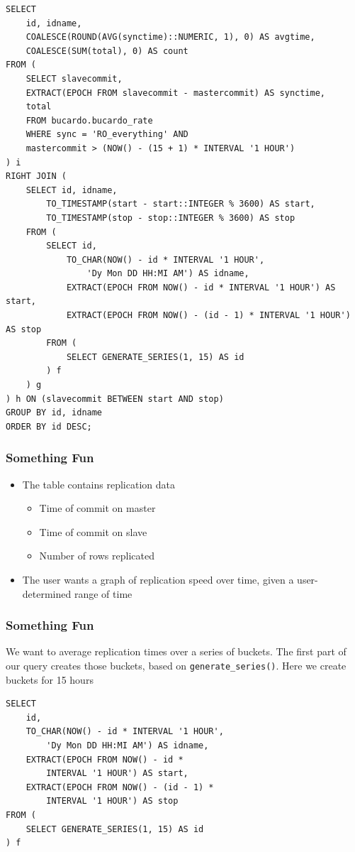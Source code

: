 \documentclass{beamer}
\begin{document}
\begin{frame}[fragile]
    \tiny
    \begin{verbatim}
SELECT
    id, idname,
    COALESCE(ROUND(AVG(synctime)::NUMERIC, 1), 0) AS avgtime,
    COALESCE(SUM(total), 0) AS count
FROM (
    SELECT slavecommit,
    EXTRACT(EPOCH FROM slavecommit - mastercommit) AS synctime,
    total
    FROM bucardo.bucardo_rate
    WHERE sync = 'RO_everything' AND
    mastercommit > (NOW() - (15 + 1) * INTERVAL '1 HOUR')
) i
RIGHT JOIN (
    SELECT id, idname,
        TO_TIMESTAMP(start - start::INTEGER % 3600) AS start,
        TO_TIMESTAMP(stop - stop::INTEGER % 3600) AS stop
    FROM (
        SELECT id,
            TO_CHAR(NOW() - id * INTERVAL '1 HOUR', 
                'Dy Mon DD HH:MI AM') AS idname,
            EXTRACT(EPOCH FROM NOW() - id * INTERVAL '1 HOUR') AS start,
            EXTRACT(EPOCH FROM NOW() - (id - 1) * INTERVAL '1 HOUR') AS stop
        FROM (
            SELECT GENERATE_SERIES(1, 15) AS id
        ) f
    ) g
) h ON (slavecommit BETWEEN start AND stop)
GROUP BY id, idname
ORDER BY id DESC;
    \end{verbatim}
\end{frame}

\begin{frame}
    \frametitle{Something Fun}
    \begin{itemize}
        \item The table contains replication data
        \begin{itemize}
            \item Time of commit on master
            \item Time of commit on slave
            \item Number of rows replicated
        \end{itemize}
        \item The user wants a graph of replication speed over time, given a user-determined range of time
    \end{itemize}
\end{frame}

\begin{frame}[fragile]
    \frametitle{Something Fun}
    We want to average replication times over a series of buckets. The first
    part of our query creates those buckets, based on
    \texttt{generate\_series()}. Here we create buckets for 15 hours
    \begin{verbatim}
SELECT 
    id,
    TO_CHAR(NOW() - id * INTERVAL '1 HOUR',
        'Dy Mon DD HH:MI AM') AS idname,
    EXTRACT(EPOCH FROM NOW() - id *
        INTERVAL '1 HOUR') AS start,
    EXTRACT(EPOCH FROM NOW() - (id - 1) *
        INTERVAL '1 HOUR') AS stop
FROM (
    SELECT GENERATE_SERIES(1, 15) AS id
) f
    \end{verbatim}
\end{frame}
\end{document}
